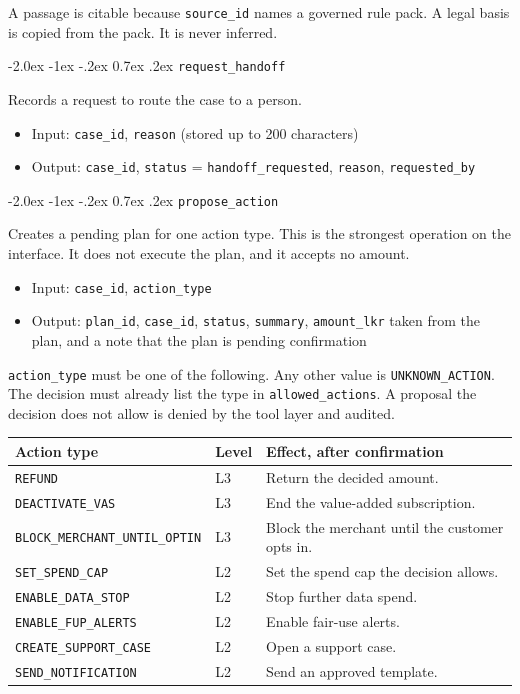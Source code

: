 \documentclass[11pt,a4paper]{article}
\makeatletter
\renewcommand\subsection{%
  \@startsection{subsection}{2}{\z@}%
    {-2.0ex \@plus -1ex \@minus -.2ex}%
    {0.7ex \@plus .2ex}%
    {\large\sffamily\bfseries\color{hcInk}}%
}
\newcommand{\tool}[1]{\texttt{#1}}
\newcommand{\code}[1]{\texttt{#1}}
\makeatother
\begin{document}
A passage is citable because \code{source\_id} names a governed rule pack. A legal basis is copied from the pack. It is never inferred.

\subsection{\tool{request\_handoff}}

Records a request to route the case to a person.

\begin{itemize}
  \item Input: \code{case\_id}, \code{reason} (stored up to 200 characters)
  \item Output: \code{case\_id}, \code{status} = \code{handoff\_requested}, \code{reason}, \code{requested\_by}
\end{itemize}

\subsection{\tool{propose\_action}}

Creates a pending plan for one action type. This is the strongest operation on the interface. It does not execute the plan, and it accepts no amount.

\begin{itemize}
  \item Input: \code{case\_id}, \code{action\_type}
  \item Output: \code{plan\_id}, \code{case\_id}, \code{status}, \code{summary}, \code{amount\_lkr} taken from the plan, and a note that the plan is pending confirmation
\end{itemize}

\code{action\_type} must be one of the following. Any other value is \code{UNKNOWN\_ACTION}. The decision must already list the type in \code{allowed\_actions}. A proposal the decision does not allow is denied by the tool layer and audited.

\begin{center}
\small
\begin{tabularx}{\textwidth}{@{}l l X@{}}
\toprule
\textbf{Action type} & \textbf{Level} & \textbf{Effect, after confirmation} \\
\midrule
\code{REFUND} & L3 & Return the decided amount. \\
\code{DEACTIVATE\_VAS} & L3 & End the value-added subscription. \\
\code{BLOCK\_MERCHANT\_UNTIL\_OPTIN} & L3 & Block the merchant until the customer opts in. \\
\code{SET\_SPEND\_CAP} & L2 & Set the spend cap the decision allows. \\
\code{ENABLE\_DATA\_STOP} & L2 & Stop further data spend. \\
\code{ENABLE\_FUP\_ALERTS} & L2 & Enable fair-use alerts. \\
\code{CREATE\_SUPPORT\_CASE} & L2 & Open a support case. \\
\code{SEND\_NOTIFICATION} & L2 & Send an approved template. \\
\bottomrule
\end{tabularx}
\end{center}
\end{document}
